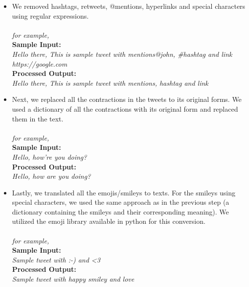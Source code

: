 \documentclass[a4paper,10pt]{article}
\begin{document}
    \begin{itemize}
        \item{
            We removed hashtags, retweets, @mentions, hyperlinks and special characters using regular expressions.
            \\ \\
            \textit{for example, \\  }
            {\textbf{Sample Input: \\} \textit{ Hello there, This is sample tweet with mentions@john, \#hashtag and link https://google.com} \\ }
            {\textbf{Processed Output: \\}\textit{  Hello there, This is sample tweet with mentions, hashtag and link \\ } }
        }
        \item{
            Next, we replaced all the contractions in the tweets to its original forms. We used a dictionary of all the contractions with its original form and replaced them in the text.
            \\ \\
            \textit{for example, \\  }
            {\textbf{Sample Input: \\} \textit{Hello, how're you doing?} \\ }
            {\textbf{Processed Output: \\}\textit{   Hello, how are you doing? \\ } }
        }
        \item{
            Lastly, we translated all the emojis/smileys to texts. For the smileys using special characters, we used the same approach as in the previous step (a dictionary containing the smileys and their corresponding meaning). We utilized the emoji library available in python for this conversion.
            \\ \\
            \textit{for example, \\  }
            {\textbf{Sample Input: \\} \textit{ Sample tweet with :-) and <3 } \\ }
            {\textbf{Processed Output: \\}\textit{   Sample tweet with happy smiley and love \\} }
        }\end{itemize}
\end{document}

